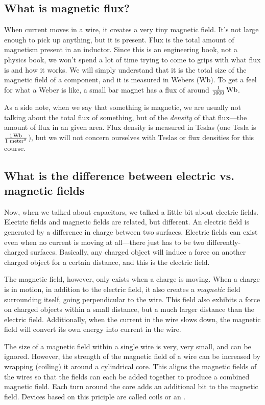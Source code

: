 \subsection{What is magnetic flux?}
When current moves in a wire, it creates a very tiny magnetic field.
It's not large enough to pick up anything, but it is present.
Flux is the total amount of magnetism present in an inductor.
Since this is an engineering book, not a physics book, we won't spend a lot of time trying to come to grips with what flux is and how it works.
We will simply understand that it is the total size of the magnetic field of a component, and it is measured in Webers (Wb).
To get a feel for what a Weber is like, a small bar magnet has a flux of around $\frac{1}{1000}\mywb$.

As a side note, when we say that something is magnetic, we are usually not talking about the total flux of something, but of the \emph{density} of that flux---the amount of flux in an given area.
Flux density is measured in Teslas (one Tesla is $\frac{1\mywb}{1\textrm{ meter}^2}$), but we will not concern ourselves with Teslas or flux densities for this course.

\subsection{What is the difference between electric vs. magnetic fields}

Now, when we talked about capacitors, we talked a little bit about electric fields.
Electric fields and magnetic fields are related, but different.
An electric field is generated by a difference in charge between two surfaces.
Electric fields can exist even when no current is moving at all---there just has to be two differently-charged surfaces.
Basically, any charged object will induce a force on another charged object for a certain distance, and this is the electric field.

The magnetic field, however, only exists when a charge is moving.
When a charge is in motion, in addition to the electric field, it also creates a \emph{magnetic} field surrounding itself, going perpendicular to the wire.
This field also exhibits a force on charged objects within a small distance, but a much larger distance than the electric field.
Additionally, when the current in the wire slows down, the magnetic field will convert its own energy into current in the wire.

The size of a magnetic field within a single wire is very, very small, and can be ignored.
However, the strength of the magnetic field of a wire can be increased by wrapping (coiling) it around a cylindrical core.
This aligns the magnetic fields of the wires so that the fields can each be added together to produce a combined magnetic field.
Each turn around the core adds an additional bit to the magnetic field.
Devices based on this priciple are called coils or an .

